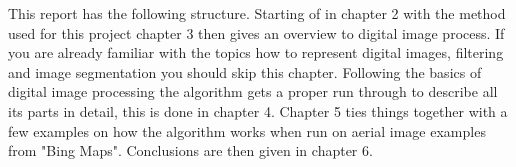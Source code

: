 This report has the following structure. Starting of in chapter 2 with the method
used for this project chapter 3 then gives an overview to digital
image process. If you are already familiar with the topics how to represent
digital images, filtering and image segmentation you should skip this chapter.
Following the basics of digital image processing the algorithm gets a proper
run through to describe all its parts in detail, this is done in chapter 4.
Chapter 5 ties things together with a few examples on how the algorithm works
when run on aerial image examples from "Bing Maps". Conclusions are then given
in chapter 6.

%
%

